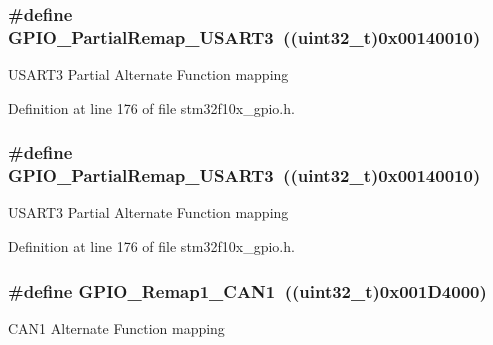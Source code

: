 \subsubsection[{\texorpdfstring{G\+P\+I\+O\+\_\+\+Partial\+Remap\+\_\+\+U\+S\+A\+R\+T3}{GPIO_PartialRemap_USART3}}]{\setlength{\rightskip}{0pt plus 5cm}\#define G\+P\+I\+O\+\_\+\+Partial\+Remap\+\_\+\+U\+S\+A\+R\+T3~(({\bf uint32\+\_\+t})0x00140010)}\hypertarget{group___g_p_i_o___remap__define_ga97af4aa8dded530353160cca615ad201}{}\label{group___g_p_i_o___remap__define_ga97af4aa8dded530353160cca615ad201}
U\+S\+A\+R\+T3 Partial Alternate Function mapping 

Definition at line 176 of file stm32f10x\+\_\+gpio.\+h.

\subsubsection[{\texorpdfstring{G\+P\+I\+O\+\_\+\+Partial\+Remap\+\_\+\+U\+S\+A\+R\+T3}{GPIO_PartialRemap_USART3}}]{\setlength{\rightskip}{0pt plus 5cm}\#define G\+P\+I\+O\+\_\+\+Partial\+Remap\+\_\+\+U\+S\+A\+R\+T3~(({\bf uint32\+\_\+t})0x00140010)}\hypertarget{group___g_p_i_o___remap__define_ga97af4aa8dded530353160cca615ad201}{}\label{group___g_p_i_o___remap__define_ga97af4aa8dded530353160cca615ad201}
U\+S\+A\+R\+T3 Partial Alternate Function mapping 

Definition at line 176 of file stm32f10x\+\_\+gpio.\+h.

\subsubsection[{\texorpdfstring{G\+P\+I\+O\+\_\+\+Remap1\+\_\+\+C\+A\+N1}{GPIO_Remap1_CAN1}}]{\setlength{\rightskip}{0pt plus 5cm}\#define G\+P\+I\+O\+\_\+\+Remap1\+\_\+\+C\+A\+N1~(({\bf uint32\+\_\+t})0x001\+D4000)}\hypertarget{group___g_p_i_o___remap__define_ga89ac81224968d8faf42475be664c1e09}{}\label{group___g_p_i_o___remap__define_ga89ac81224968d8faf42475be664c1e09}
C\+A\+N1 Alternate Function mapping 

